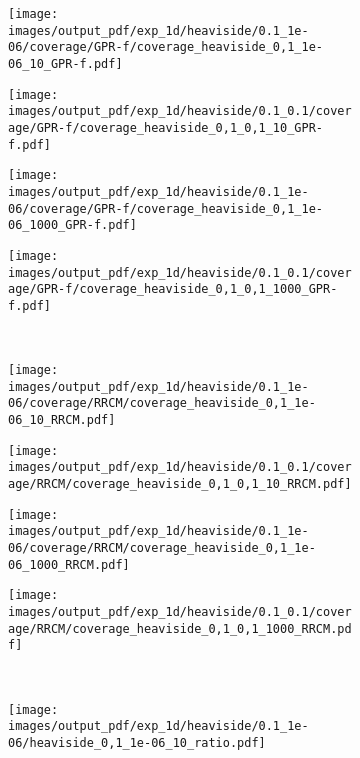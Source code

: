 \documentclass[a4paper,14pt]{extarticle}
\begin{document}
\begin{figure}%
  \centering
  \begin{subfigure}[b]{0.25\linewidth}
    \texttt{[image: images/output\_pdf/exp\_1d/heaviside/0.1\_1e-06/coverage/GPR-f/coverage\_heaviside\_0,1\_1e-06\_10\_GPR-f.pdf]}
  \end{subfigure}%
  \begin{subfigure}[b]{0.25\linewidth}
    \texttt{[image: images/output\_pdf/exp\_1d/heaviside/0.1\_0.1/coverage/GPR-f/coverage\_heaviside\_0,1\_0,1\_10\_GPR-f.pdf]}
  \end{subfigure}%
  \begin{subfigure}[b]{0.25\linewidth}
    \texttt{[image: images/output\_pdf/exp\_1d/heaviside/0.1\_1e-06/coverage/GPR-f/coverage\_heaviside\_0,1\_1e-06\_1000\_GPR-f.pdf]}
  \end{subfigure}%
  \begin{subfigure}[b]{0.25\linewidth}
    \texttt{[image: images/output\_pdf/exp\_1d/heaviside/0.1\_0.1/coverage/GPR-f/coverage\_heaviside\_0,1\_0,1\_1000\_GPR-f.pdf]}
  \end{subfigure}\\
  \begin{subfigure}[b]{0.25\linewidth}
    \texttt{[image: images/output\_pdf/exp\_1d/heaviside/0.1\_1e-06/coverage/RRCM/coverage\_heaviside\_0,1\_1e-06\_10\_RRCM.pdf]}
  \end{subfigure}%
  \begin{subfigure}[b]{0.25\linewidth}
    \texttt{[image: images/output\_pdf/exp\_1d/heaviside/0.1\_0.1/coverage/RRCM/coverage\_heaviside\_0,1\_0,1\_10\_RRCM.pdf]}
  \end{subfigure}%
  \begin{subfigure}[b]{0.25\linewidth}
    \texttt{[image: images/output\_pdf/exp\_1d/heaviside/0.1\_1e-06/coverage/RRCM/coverage\_heaviside\_0,1\_1e-06\_1000\_RRCM.pdf]}
  \end{subfigure}%
  \begin{subfigure}[b]{0.25\linewidth}
    \texttt{[image: images/output\_pdf/exp\_1d/heaviside/0.1\_0.1/coverage/RRCM/coverage\_heaviside\_0,1\_0,1\_1000\_RRCM.pdf]}
  \end{subfigure}\\
  \begin{subfigure}[b]{0.25\linewidth}
    \texttt{[image: images/output\_pdf/exp\_1d/heaviside/0.1\_1e-06/heaviside\_0,1\_1e-06\_10\_ratio.pdf]}

\end{subfigure}
\end{figure}
\end{document}

